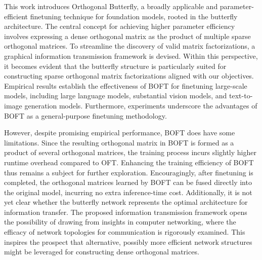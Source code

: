 This work introduces Orthogonal Butterfly, a broadly applicable and parameter-efficient finetuning technique for foundation models, rooted in the butterfly architecture. The central concept for achieving higher parameter efficiency involves expressing a dense orthogonal matrix as the product of multiple sparse orthogonal matrices. To streamline the discovery of valid matrix factorizations, a graphical information transmission framework is devised. Within this perspective, it becomes evident that the butterfly structure is particularly suited for constructing sparse orthogonal matrix factorizations aligned with our objectives. Empirical results establish the effectiveness of BOFT for finetuning large-scale models, including large language models, substantial vision models, and text-to-image generation models. Furthermore, experiments underscore the advantages of BOFT as a general-purpose finetuning methodology.

However, despite promising empirical performance, BOFT does have some limitations. Since the resulting orthogonal matrix in BOFT is formed as a product of several orthogonal matrices, the training process incurs slightly higher runtime overhead compared to OFT. Enhancing the training efficiency of BOFT thus remains a subject for further exploration. Encouragingly, after finetuning is completed, the orthogonal matrices learned by BOFT can be fused directly into the original model, incurring no extra inference-time cost. Additionally, it is not yet clear whether the butterfly network represents the optimal architecture for information transfer. The proposed information transmission framework opens the possibility of drawing from insights in computer networking, where the efficacy of network topologies for communication is rigorously examined. This inspires the prospect that alternative, possibly more efficient network structures might be leveraged for constructing dense orthogonal matrices.